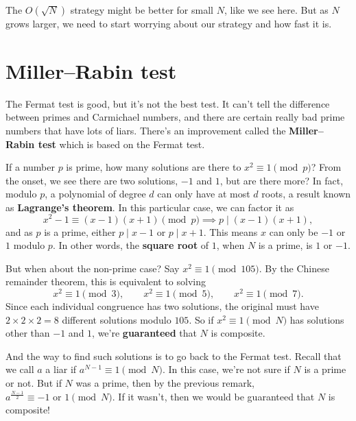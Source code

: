 \documentclass[11pt,paper=letter]{scrartcl}
\begin{document}
The $O(\sqrt N)$ strategy might be better for small $N$, like we see here. But as $N$ grows larger, we need to start worrying about our strategy and how fast it is.

\section{Miller--Rabin test}

The Fermat test is good, but it's not the best test. It can't tell the difference between primes and Carmichael numbers, and there are certain really bad prime numbers that have lots of liars. There's an improvement called the \textbf{Miller--Rabin test} which is based on the Fermat test.

If a number $p$ is prime, how many solutions are there to $x^2 \equiv 1 \pmod p$? From the onset, we see there are two solutions, $-1$ and $1$, but are there more? In fact, modulo $p$, a polynomial of degree $d$ can only have at most $d$ roots, a result known as \textbf{Lagrange's theorem}. In this particular case, we can factor it as $$x^2 - 1 \equiv (x - 1)(x + 1) \pmod p \implies p \mid (x - 1)(x + 1),$$
and as $p$ is a prime, either $p \mid x - 1$ or $p \mid x + 1$. This means $x$ can only be $-1$ or $1$ modulo $p$. In other words, the \textbf{square root} of $1$, when $N$ is a prime, is $1$ or $-1$.

But when about the non-prime case? Say $x^2 \equiv 1 \pmod{105}$. By the Chinese remainder theorem, this is equivalent to solving
$$x^2 \equiv 1 \pmod 3, \qquad x^2 \equiv 1 \pmod 5, \qquad x^2 \equiv 1 \pmod 7.$$
Since each individual congruence has two solutions, the original must have $2 \times 2 \times 2 = 8$ different solutions modulo $105$. So if $x^2 \equiv 1 \pmod N$ has solutions other than $-1$ and $1$, we're \textbf{guaranteed} that $N$ is composite.

And the way to find such solutions is to go back to the Fermat test. Recall that we call $a$ a liar if $a^{N-1} \equiv 1 \pmod N$. In this case, we're not sure if $N$ is a prime or not. But if $N$ was a prime, then by the previous remark, $a^{\frac{N-1}2} \equiv -1 \text{ or } 1 \pmod N$. If it wasn't, then we would be guaranteed that $N$ is composite!
\end{document}
